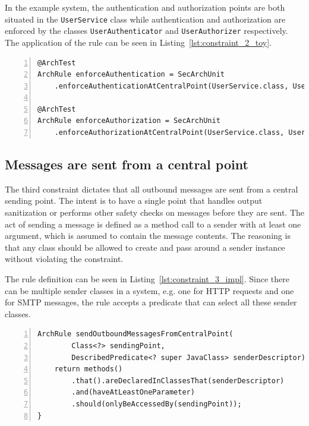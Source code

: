 In the example system, the authentication and authorization points are both situated in the \texttt{UserService} class while authentication and authorization are enforced by the classes \texttt{UserAuthenticator} and \texttt{UserAuthorizer} respectively. The application of the rule can be seen in Listing~\ref{lst:constraint_2_toy}.

\begin{minipage}{\linewidth}
\begin{lstlisting}[caption={Application of constraint 2 to the example system.}, captionpos=b, label=lst:constraint_2_toy, numbers=left]
@ArchTest
ArchRule enforceAuthentication = SecArchUnit
    .enforceAuthenticationAtCentralPoint(UserService.class, UserAuthenticator.class);

@ArchTest
ArchRule enforceAuthorization = SecArchUnit
    .enforceAuthorizationAtCentralPoint(UserService.class, UserAuthorizer.class);
\end{lstlisting}
\end{minipage}

\subsection{Messages are sent from a central point}
The third constraint dictates that all outbound messages are sent from a central sending point. The intent is to have a single point that handles output sanitization or performs other safety checks on messages before they are sent. The act of sending a message is defined as a method call to a sender with at least one argument, which is assumed to contain the message contents. The reasoning is that any class should be allowed to create and pass around a sender instance without violating the constraint.

The rule definition can be seen in Listing~\ref{lst:constraint_3_impl}. Since there can be multiple sender classes in a system, e.g. one for HTTP requests and one for SMTP messages, the rule accepts a predicate that can select all these sender classes.

\begin{minipage}{\linewidth}
\begin{lstlisting}[caption={Rule definition for constraint 3.}, captionpos=b, label=lst:constraint_3_impl, numbers=left]
ArchRule sendOutboundMessagesFromCentralPoint(
        Class<?> sendingPoint,
        DescribedPredicate<? super JavaClass> senderDescriptor) {
    return methods()
        .that().areDeclaredInClassesThat(senderDescriptor)
        .and(haveAtLeastOneParameter)
        .should(onlyBeAccessedBy(sendingPoint));
}
\end{lstlisting}
\end{minipage}

